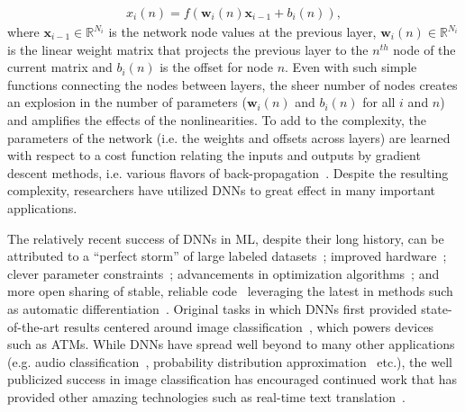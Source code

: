 \documentclass[11pt,lettersize]{article}
\begin{document}
\begin{gather}
    x_i(n) = f\left( \bm{w}_i(n)\bm{x}_{i-1} +  b_i(n) \right), \nonumber
\end{gather}
where $\bm{x}_{i-1}\in\mathbb{R}^{N_i}$ is the network node values at the previous layer, $\bm{w}_i(n)\in\mathbb{R}^{N_i}$ is the linear weight matrix that projects the previous layer to the $n^{th}$ node of the current matrix and $b_i(n)$ is the offset for node $n$. Even with such simple functions connecting the nodes between layers, the sheer number of nodes creates an explosion in the number of parameters ($\bm{w}_i(n)$ and $b_i(n)$ for all $i$ and $n$) and amplifies the effects of the nonlinearities. To add to the complexity, the parameters of the network (i.e. the weights and offsets across layers) are learned with respect to a cost function relating the inputs and outputs by gradient descent methods, i.e. various flavors of back-propagation~\cite{rumelhart1986learning}. Despite the resulting complexity, researchers have utilized DNNs to great effect in many important applications. 

The relatively recent success of DNNs in ML, despite their long history, can be attributed to a ``perfect storm'' of large labeled datasets~\cite{deng2012mnist,deng2009imagenet}; improved hardware~\cite{jouppi2017datacenter}; clever parameter constraints~\cite{krizhevsky2012imagenet}; advancements in optimization algorithms~\cite{kingma2014adam,sutskever2013importance,johnson2013accelerating}; and more open sharing of stable, reliable code~\cite{abadi2016tensorflow} leveraging the latest in methods such as automatic differentiation~\cite{rall1981automatic}. Original tasks in which DNNs first provided state-of-the-art results centered around image classification~\cite{krizhevsky2012imagenet,lecun1998gradient}, which powers devices such as ATMs. While DNNs have spread well beyond to many other applications (e.g. audio classification~\cite{hinton2012deep}, probability distribution approximation~\cite{kingma2013auto,makhzani2015adversarial} etc.),
the well publicized success in image classification has encouraged continued work that has provided other amazing technologies such as real-time text translation~\cite{good2015blog}. 
\end{document}
